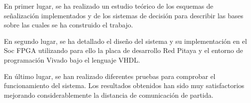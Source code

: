 En primer lugar, se ha realizado un estudio teórico de los esquemas de señalización 
implementados y de los sistemas de decisión para describir las bases sobre las cuales se 
ha construido el trabajo.

En segundo lugar, se ha detallado el diseño del sistema y su implementación en el Soc 
FPGA utilizando para ello la placa de desarrollo Red Pitaya y el entorno de programación
Vivado bajo el lenguaje VHDL.

En último lugar, se han realizado diferentes pruebas para comprobar el funcionamiento del 
sistema. Los resultados obtenidos han sido muy satisfactorios 
mejorando considerablemente la distancia de comunicación de partida.


\blankpage
